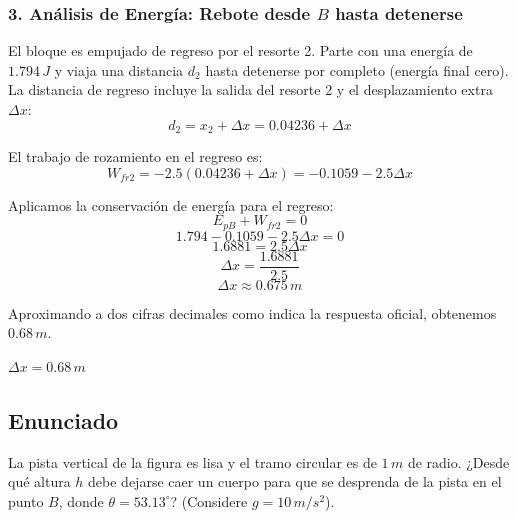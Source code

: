 \documentclass[12pt, a4paper]{article}
\begin{document}
\subsubsection*{3. Análisis de Energía: Rebote desde $B$ hasta detenerse}
El bloque es empujado de regreso por el resorte 2. Parte con una energía de $1.794 \, \si{J}$ y viaja una distancia $d_2$ hasta detenerse por completo (energía final cero).
La distancia de regreso incluye la salida del resorte 2 y el desplazamiento extra $\Delta x$:
$$ d_2 = x_2 + \Delta x = 0.04236 + \Delta x $$

El trabajo de rozamiento en el regreso es:
$$ W_{fr2} = -2.5(0.04236 + \Delta x) = -0.1059 - 2.5\Delta x $$

Aplicamos la conservación de energía para el regreso:
$$ E_{pB} + W_{fr2} = 0 $$
$$ 1.794 - 0.1059 - 2.5\Delta x = 0 $$
$$ 1.6881 = 2.5\Delta x $$
$$ \Delta x = \frac{1.6881}{2.5} $$
$$ \Delta x \approx 0.675 \, \si{m} $$

Aproximando a dos cifras decimales como indica la respuesta oficial, obtenemos $0.68 \, \si{m}$.

\begin{tcolorbox}[colback=green!5!white, colframe=green!50!black, title=Respuesta Final]
\centering \Large $\Delta x = 0.68 \, \si{m}$
\end{tcolorbox}

\newpage

\subsection*{Enunciado}
La pista vertical de la figura es lisa y el tramo circular es de $1 \, \si{m}$ de radio. ¿Desde qué altura $h$ debe dejarse caer un cuerpo para que se desprenda de la pista en el punto $B$, donde $\theta = 53.13^\circ$? (Considere $g = 10 \, \si{m/s^2}$).

\begin{center}
\end{center}
\end{document}
